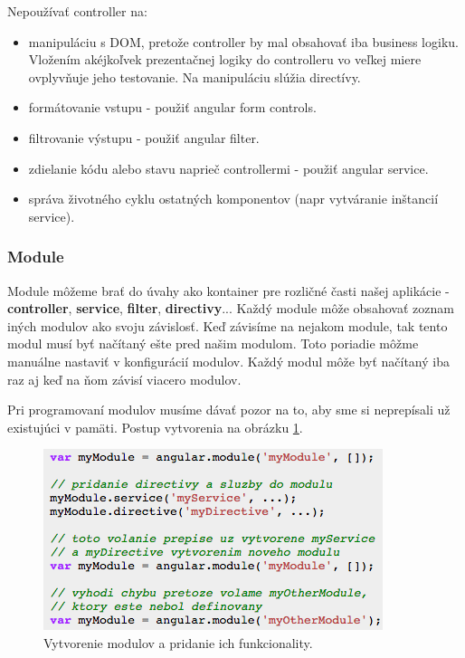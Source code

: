 \noindent Nepoužívať controller na:
\begin{itemize}
\item manipuláciu s DOM, pretože controller by mal obsahovať iba business logiku. Vložením akéjkoľvek prezentačnej logiky do controlleru vo veľkej miere ovplyvňuje jeho testovanie. Na manipuláciu slúžia directívy.
\item formátovanie vstupu - použiť angular form controls.
\item filtrovanie výstupu - použiť angular filter.
\item zdielanie kódu alebo stavu naprieč controllermi - použiť angular service.
\item správa životného cyklu ostatných komponentov (napr vytváranie inštancií service).
\end{itemize}


\subsubsection{Module}
Module môžeme brať do úvahy ako kontainer pre rozličné časti našej aplikácie - \textbf{controller}, \textbf{service}, \textbf{filter}, \textbf{directivy}... Každý module môže obsahovať zoznam iných modulov ako svoju závislosť. Keď závisíme na nejakom module, tak tento modul musí byť načítaný ešte pred našim modulom. Toto poriadie môžme manuálne nastaviť v konfigurácií modulov. Každý modul môže byť načítaný iba raz aj keď na ňom závisí viacero modulov.\cite{angular-docs}

Pri programovaní modulov musíme dávať pozor na to, aby sme si neprepísali už existujúci v pamäti. Postup vytvorenia na obrázku \ref{img-angular-controller-def}.

\begin{figure}[H]
  \centering
  \includegraphics[scale=0.8]{img/code/angular-module.png}
  \caption{Vytvorenie modulov a pridanie ich funkcionality.}
  \label{img-angular-controller-def}
\end{figure}

